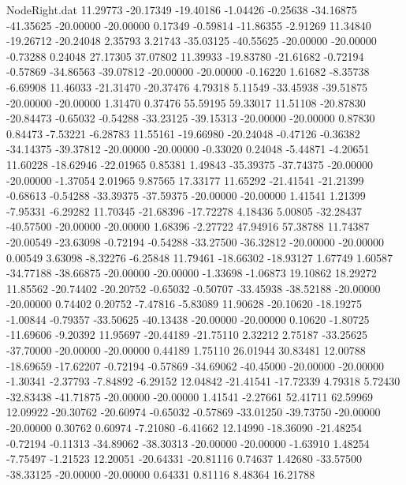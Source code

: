 \begin{filecontents}{NodeRight.dat}
  11.29773  -20.17349  -19.40186    -1.04426   -0.25638  -34.16875  -41.35625  -20.00000  -20.00000    0.17349   -0.59814  -11.86355   -2.91269
  11.34840  -19.26712  -20.24048     2.35793    3.21743  -35.03125  -40.55625  -20.00000  -20.00000   -0.73288    0.24048   27.17305   37.07802
  11.39933  -19.83780  -21.61682    -0.72194   -0.57869  -34.86563  -39.07812  -20.00000  -20.00000   -0.16220    1.61682   -8.35738   -6.69908
  11.46033  -21.31470  -20.37476     4.79318    5.11549  -33.45938  -39.51875  -20.00000  -20.00000    1.31470    0.37476   55.59195   59.33017
  11.51108  -20.87830  -20.84473    -0.65032   -0.54288  -33.23125  -39.15313  -20.00000  -20.00000    0.87830    0.84473   -7.53221   -6.28783
  11.55161  -19.66980  -20.24048    -0.47126   -0.36382  -34.14375  -39.37812  -20.00000  -20.00000   -0.33020    0.24048   -5.44871   -4.20651
  11.60228  -18.62946  -22.01965     0.85381    1.49843  -35.39375  -37.74375  -20.00000  -20.00000   -1.37054    2.01965    9.87565   17.33177
  11.65292  -21.41541  -21.21399    -0.68613   -0.54288  -33.39375  -37.59375  -20.00000  -20.00000    1.41541    1.21399   -7.95331   -6.29282
  11.70345  -21.68396  -17.72278     4.18436    5.00805  -32.28437  -40.57500  -20.00000  -20.00000    1.68396   -2.27722   47.94916   57.38788
  11.74387  -20.00549  -23.63098    -0.72194   -0.54288  -33.27500  -36.32812  -20.00000  -20.00000    0.00549    3.63098   -8.32276   -6.25848
  11.79461  -18.66302  -18.93127     1.67749    1.60587  -34.77188  -38.66875  -20.00000  -20.00000   -1.33698   -1.06873   19.10862   18.29272
  11.85562  -20.74402  -20.20752    -0.65032   -0.50707  -33.45938  -38.52188  -20.00000  -20.00000    0.74402    0.20752   -7.47816   -5.83089
  11.90628  -20.10620  -18.19275    -1.00844   -0.79357  -33.50625  -40.13438  -20.00000  -20.00000    0.10620   -1.80725  -11.69606   -9.20392
  11.95697  -20.44189  -21.75110     2.32212    2.75187  -33.25625  -37.70000  -20.00000  -20.00000    0.44189    1.75110   26.01944   30.83481
  12.00788  -18.69659  -17.62207    -0.72194   -0.57869  -34.69062  -40.45000  -20.00000  -20.00000   -1.30341   -2.37793   -7.84892   -6.29152
  12.04842  -21.41541  -17.72339     4.79318    5.72430  -32.83438  -41.71875  -20.00000  -20.00000    1.41541   -2.27661   52.41711   62.59969
  12.09922  -20.30762  -20.60974    -0.65032   -0.57869  -33.01250  -39.73750  -20.00000  -20.00000    0.30762    0.60974   -7.21080   -6.41662
  12.14990  -18.36090  -21.48254    -0.72194   -0.11313  -34.89062  -38.30313  -20.00000  -20.00000   -1.63910    1.48254   -7.75497   -1.21523
  12.20051  -20.64331  -20.81116     0.74637    1.42680  -33.57500  -38.33125  -20.00000  -20.00000    0.64331    0.81116    8.48364   16.21788

\end{filecontents}
